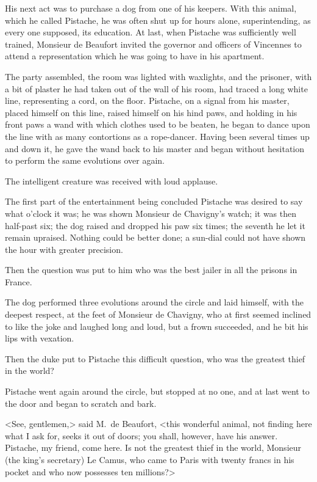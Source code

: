 His next act was to purchase a dog from one of his keepers. With this animal, which he called Pistache, he was often shut up for hours alone, superintending, as every one supposed, its education. At last, when Pistache was sufficiently well trained, Monsieur de Beaufort invited the governor and officers of Vincennes to attend a representation which he was going to have in his apartment.

The party assembled, the room was lighted with waxlights, and the prisoner, with a bit of plaster he had taken out of the wall of his room, had traced a long white line, representing a cord, on the floor. Pistache, on a signal from his master, placed himself on this line, raised himself on his hind paws, and holding in his front paws a wand with which clothes used to be beaten, he began to dance upon the line with as many contortions as a rope-dancer. Having been several times up and down it, he gave the wand back to his master and began without hesitation to perform the same evolutions over again.

The intelligent creature was received with loud applause.

The first part of the entertainment being concluded Pistache was desired to say what o'clock it was; he was shown Monsieur de Chavigny's watch; it was then half-past six; the dog raised and dropped his paw six times; the seventh he let it remain upraised. Nothing could be better done; a sun-dial could not have shown the hour with greater precision.

Then the question was put to him who was the best jailer in all the prisons in France.

The dog performed three evolutions around the circle and laid himself, with the deepest respect, at the feet of Monsieur de Chavigny, who at first seemed inclined to like the joke and laughed long and loud, but a frown succeeded, and he bit his lips with vexation.

Then the duke put to Pistache this difficult question, who was the greatest thief in the world?

Pistache went again around the circle, but stopped at no one, and at last went to the door and began to scratch and bark.

<See, gentlemen,> said M.~de Beaufort, <this wonderful animal, not finding here what I ask for, seeks it out of doors; you shall, however, have his answer. Pistache, my friend, come here. Is not the greatest thief in the world, Monsieur (the king's secretary) Le Camus, who came to Paris with twenty francs in his pocket and who now possesses ten millions?>

